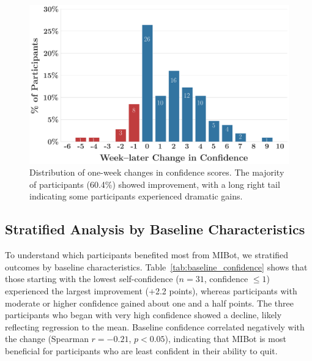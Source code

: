 \begin{figure}[ht]
  \centering
  \includegraphics[width=0.8\linewidth]{fig/2024-11-14-MIV6.3A-2024-11-22-MIV6.3A_ruler_deltas_delta_with_week_later_keep_high_conf_False_change.png}
  \caption{Distribution of one-week changes in confidence scores. The majority of participants (60.4\%) showed improvement, with a long right tail indicating some participants experienced dramatic gains.}
  \label{fig:confidence_change_distribution}
\end{figure}



\subsection{Stratified Analysis by Baseline Characteristics}

To understand which participants benefited most from MIBot, we stratified outcomes by baseline characteristics. Table~\ref{tab:baseline_confidence} shows that those starting with the lowest self-confidence ($n=31$, confidence $\leq 1$) experienced the largest improvement (+2.2 points), whereas participants with moderate or higher confidence gained about one and a half points. The three participants who began with very high confidence showed a decline, likely reflecting regression to the mean. Baseline confidence correlated negatively with the change (Spearman $r=-0.21$, $p<0.05$), indicating that MIBot is most beneficial for participants who are least confident in their ability to quit.

